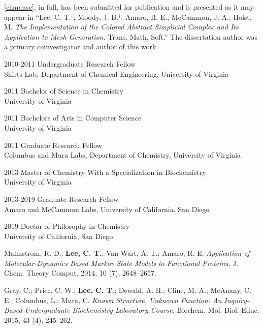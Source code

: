 \begin{frontmatter}
\begin{acknowledgements}
\par \cref{chap:asc}, in full, has been submitted for publication and is presented as it may appear in
``Lee, C. T.$^{\dagger}$; Moody, J. B.$^{\dagger}$; Amaro, R. E.; McCammon, J. A.; Holst, M. \emph{The Implementation of the Colored Abstract Simplicial Complex and Its Application to Mesh Generation.} Trans. Math. Soft.''
The dissertation author was a primary coinvestigator and author of this work.
\end{acknowledgements}


%
%
\begin{vitapage}
\begin{vita}
  \item[2010-2011] Undergraduate Research Fellow\\ Shirts Lab, Department of Chemical Engineering, University of Virginia
  \item[2011] Bachelor of Science in Chemistry\\University of Virginia
  \item[2011] Bachelors of Arts in Computer Science\\
  University of Virginia
  \item[2011] Graduate Research Fellow\\
  Columbus and Mura Labs, Department of Chemistry, University of Virginia
  \item[2013] Master of Chemistry With a Specialization in Biochemistry\\ University of Virginia
  \item[2013-2019] Graduate Research Fellow\\ Amaro and McCammon Labs, University of California, San Diego
  \item[2019] Doctor of Philosophy in Chemistry\\ University of California, San Diego
\end{vita}
\begin{publications}
  \item Malmstrom, R. D.; \textbf{Lee, C. T.}; Van Wart, A. T.; Amaro, R. E. \emph{Application of Molecular-Dynamics Based Markov State Models to Functional Proteins.} J. Chem. Theory Comput. 2014, 10 (7), 2648–2657.
  \item Gray, C.; Price, C. W.; \textbf{Lee, C. T.}; Dewald, A. H.; Cline, M. A.; McAnany, C. E.; Columbus, L.; Mura, C. \emph{Known Structure, Unknown Function: An Inquiry-Based Undergraduate Biochemistry Laboratory Course.} Biochem. Mol. Biol. Educ. 2015, 43 (4), 245–262.

\end{publications}
\end{vitapage}
\end{frontmatter}
